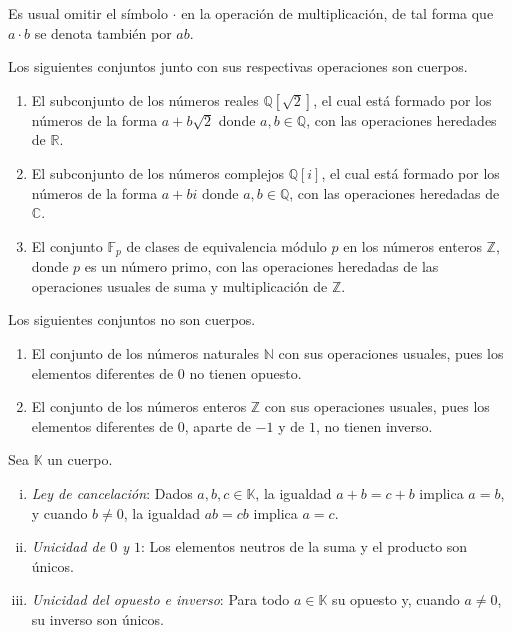 \begin{nota}
Es usual omitir el símbolo $\cdot$ en la operación de multiplicación, de tal forma que $a\cdot b$ se denota también por $ab$.
\end{nota}

\begin{ejem}
Los siguientes conjuntos junto con sus respectivas operaciones son cuerpos.
\begin{enumerate}
\item El subconjunto de los números reales $\mathbb{Q}[\sqrt{2}]$, el cual está formado por los números de la forma $a+b\sqrt{2}$ donde $a,b\in\mathbb{Q}$, con las operaciones heredades de $\mathbb{R}$. 
\item El subconjunto de los números complejos $\mathbb{Q}[i]$, el cual está formado por los números de la forma $a+bi$ donde $a,b\in\mathbb{Q}$, con las operaciones heredadas de $\mathbb{C}$.
\item El conjunto $\mathbb{F}_p$ de clases de equivalencia módulo $p$ en los números enteros $\mathbb{Z}$, donde $p$ es un número primo, con las operaciones heredadas de las operaciones usuales de suma y multiplicación de $\mathbb{Z}$.
\end{enumerate}
\end{ejem}

\begin{ejem}
Los siguientes conjuntos no son cuerpos.
\begin{enumerate}
\item El conjunto de los números naturales $\mathbb{N}$ con sus operaciones usuales, pues los elementos diferentes de $0$ no tienen opuesto.
\item El conjunto de los números enteros $\mathbb{Z}$ con sus operaciones usuales, pues los elementos diferentes de $0$, aparte de $-1$ y de $1$, no tienen inverso.
\end{enumerate}
\end{ejem}

\begin{prop}
  Sea $\mathbb{K}$ un cuerpo.
  \begin{enumerate}[(i)]
    \item \emph{Ley de cancelación}: Dados $a,b,c\in \mathbb{K}$, la igualdad $a+b=c+b$ implica $a=b$, y cuando $b\ne 0$, la igualdad $ab=cb$ implica $a=c$. 
    \item \emph{Unicidad de $0$ y $1$}: Los elementos neutros de la suma y el producto son únicos.
    \item \emph{Unicidad del opuesto e inverso}: Para todo $a\in\mathbb{K}$ su opuesto y, cuando $a\ne 0$, su inverso son únicos.
  \end{enumerate}
\end{prop}

